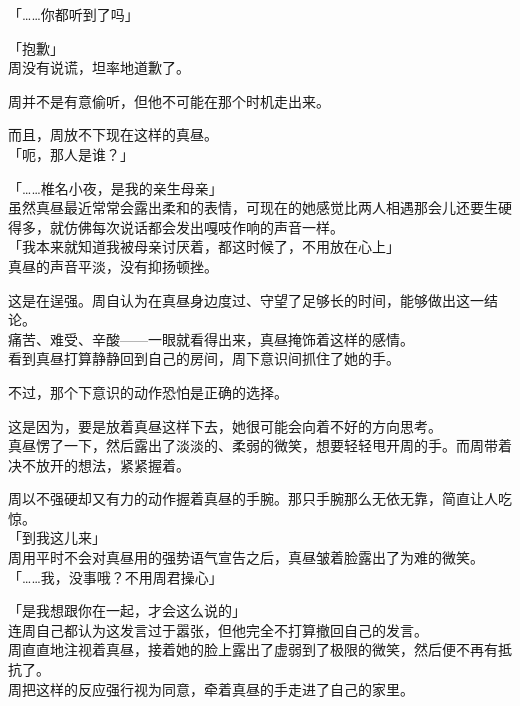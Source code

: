 「……你都听到了吗」

「抱歉」\\

周没有说谎，坦率地道歉了。

周并不是有意偷听，但他不可能在那个时机走出来。

而且，周放不下现在这样的真昼。\\

「呃，那人是谁？」

「……椎名小夜，是我的亲生母亲」\\

虽然真昼最近常常会露出柔和的表情，可现在的她感觉比两人相遇那会儿还要生硬得多，就仿佛每次说话都会发出嘎吱作响的声音一样。\\

「我本来就知道我被母亲讨厌着，都这时候了，不用放在心上」\\

真昼的声音平淡，没有抑扬顿挫。

这是在逞强。周自认为在真昼身边度过、守望了足够长的时间，能够做出这一结论。\\

痛苦、难受、辛酸——一眼就看得出来，真昼掩饰着这样的感情。\\

看到真昼打算静静回到自己的房间，周下意识间抓住了她的手。

不过，那个下意识的动作恐怕是正确的选择。

这是因为，要是放着真昼这样下去，她很可能会向着不好的方向思考。\\

真昼愣了一下，然后露出了淡淡的、柔弱的微笑，想要轻轻甩开周的手。而周带着决不放开的想法，紧紧握着。

周以不强硬却又有力的动作握着真昼的手腕。那只手腕那么无依无靠，简直让人吃惊。\\

「到我这儿来」\\

周用平时不会对真昼用的强势语气宣告之后，真昼皱着脸露出了为难的微笑。\\

「……我，没事哦？不用周君操心」

「是我想跟你在一起，才会这么说的」\\

连周自己都认为这发言过于嚣张，但他完全不打算撤回自己的发言。\\

周直直地注视着真昼，接着她的脸上露出了虚弱到了极限的微笑，然后便不再有抵抗了。\\

周把这样的反应强行视为同意，牵着真昼的手走进了自己的家里。
